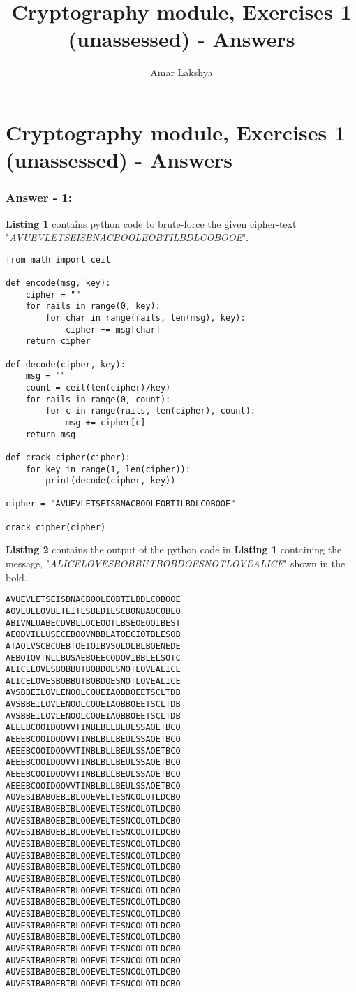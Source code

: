 \documentclass[10pt,a4paper,oneside]{article}
\author{Amar Lakshya}
\title{Cryptography module, Exercises 1 (unassessed) - Answers}
\begin{document}
\part*{Cryptography module, Exercises 1 (unassessed) - Answers}
\section*{Answer - 1:}

\textbf{Listing 1} contains python code to brute-force the given cipher-text "\textit{AVUEVLETSEISBNACBOOLEOBTILBDLCOBOOE}".

\begin{lstlisting}
from math import ceil

def encode(msg, key):
    cipher = ""
    for rails in range(0, key):
        for char in range(rails, len(msg), key):
            cipher += msg[char]
    return cipher

def decode(cipher, key):
    msg = ""
    count = ceil(len(cipher)/key)
    for rails in range(0, count):
        for c in range(rails, len(cipher), count):
            msg += cipher[c]
    return msg

def crack_cipher(cipher):
    for key in range(1, len(cipher)):
        print(decode(cipher, key))

cipher = "AVUEVLETSEISBNACBOOLEOBTILBDLCOBOOE"

crack_cipher(cipher)
\end{lstlisting}
\textbf{Listing 2} contains the output of the python code in \textbf{Listing 1} containing the message, "\textit{ALICELOVESBOBBUTBOBDOESNOTLOVEALICE}" shown in the bold.


\lstset{keywordstyle=\bfseries}
\begin{lstlisting}
AVUEVLETSEISBNACBOOLEOBTILBDLCOBOOE
AOVLUEEOVBLTEITLSBEDILSCBONBAOCOBEO
ABIVNLUABECDVBLLOCEOOTLBSEOEOOIBEST
AEODVILLUSECEBOOVNBBLATOECIOTBLESOB
ATAOLVSCBCUEBTOEIOIBVSOLOLBLBOENEDE
AEBOIOVTNLLBUSAEBOEECODOVIBBLELSOTC
ALICELOVESBOBBUTBOBDOESNOTLOVEALICE
ALICELOVESBOBBUTBOBDOESNOTLOVEALICE
AVSBBEILOVLENOOLCOUEIAOBBOEETSCLTDB
AVSBBEILOVLENOOLCOUEIAOBBOEETSCLTDB
AVSBBEILOVLENOOLCOUEIAOBBOEETSCLTDB
AEEEBCOOIDOOVVTINBLBLLBEULSSAOETBCO
AEEEBCOOIDOOVVTINBLBLLBEULSSAOETBCO
AEEEBCOOIDOOVVTINBLBLLBEULSSAOETBCO
AEEEBCOOIDOOVVTINBLBLLBEULSSAOETBCO
AEEEBCOOIDOOVVTINBLBLLBEULSSAOETBCO
AEEEBCOOIDOOVVTINBLBLLBEULSSAOETBCO
AUVESIBABOEBIBLOOEVELTESNCOLOTLDCBO
AUVESIBABOEBIBLOOEVELTESNCOLOTLDCBO
AUVESIBABOEBIBLOOEVELTESNCOLOTLDCBO
AUVESIBABOEBIBLOOEVELTESNCOLOTLDCBO
AUVESIBABOEBIBLOOEVELTESNCOLOTLDCBO
AUVESIBABOEBIBLOOEVELTESNCOLOTLDCBO
AUVESIBABOEBIBLOOEVELTESNCOLOTLDCBO
AUVESIBABOEBIBLOOEVELTESNCOLOTLDCBO
AUVESIBABOEBIBLOOEVELTESNCOLOTLDCBO
AUVESIBABOEBIBLOOEVELTESNCOLOTLDCBO
AUVESIBABOEBIBLOOEVELTESNCOLOTLDCBO
AUVESIBABOEBIBLOOEVELTESNCOLOTLDCBO
AUVESIBABOEBIBLOOEVELTESNCOLOTLDCBO
AUVESIBABOEBIBLOOEVELTESNCOLOTLDCBO
AUVESIBABOEBIBLOOEVELTESNCOLOTLDCBO
AUVESIBABOEBIBLOOEVELTESNCOLOTLDCBO
AUVESIBABOEBIBLOOEVELTESNCOLOTLDCBO
\end{lstlisting}
\end{document}
